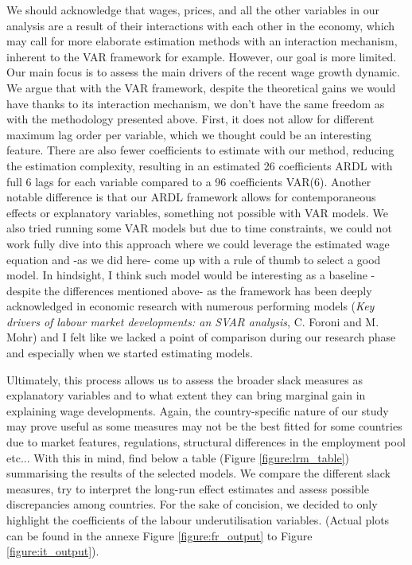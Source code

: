 We should acknowledge that wages, prices, and all the other variables in our analysis are a result of their interactions with each other in the economy, which may call for more elaborate estimation methods with an interaction mechanism, inherent to the VAR framework for example. However, our goal is more limited. 
Our main focus is to assess the main drivers of the recent wage growth dynamic. 
We argue that with the VAR framework, despite the theoretical gains we would have thanks to its interaction mechanism, we don’t have the same freedom as with the methodology presented above. 
First, it does not allow for different maximum lag order per variable, which we thought could be an interesting feature. 
There are also fewer coefficients to estimate with our method, reducing the estimation complexity, resulting in an estimated 26 coefficients ARDL with full 6 lags for each variable compared to a 96 coefficients VAR(6). 
Another notable difference is that our ARDL framework allows for contemporaneous effects or explanatory variables, something not possible with VAR models. 
We also tried running some VAR models but due to time constraints, we could not work fully dive into this approach where we could leverage the estimated wage equation and -as we did here- come up with a rule of thumb to select a good model. 
In hindsight, I think such model would be interesting as a baseline -despite the differences mentioned above- as the framework has been deeply acknowledged in economic research with numerous performing models (\textit{Key drivers of labour market developments: an SVAR analysis}, C. Foroni and M. Mohr) and I felt like we lacked a point of comparison during our research phase and especially when we started estimating models.

Ultimately, this process allows us to assess the broader slack measures as explanatory variables and to what extent they can bring marginal gain in explaining wage developments. 
Again, the country-specific nature of our study may prove useful as some measures may not be the best fitted for some countries due to market features, regulations, structural differences in the employment pool etc... 
With this in mind, find below a table (Figure \ref{figure:lrm_table}) summarising the results of the selected models. 
We compare the different slack measures, try to interpret the long-run effect estimates and assess possible discrepancies among countries. 
For the sake of concision, we decided to only highlight the coefficients of the labour underutilisation variables. (Actual plots can be found in the annexe Figure \ref{figure:fr_output} to Figure \ref{figure:it_output}).

